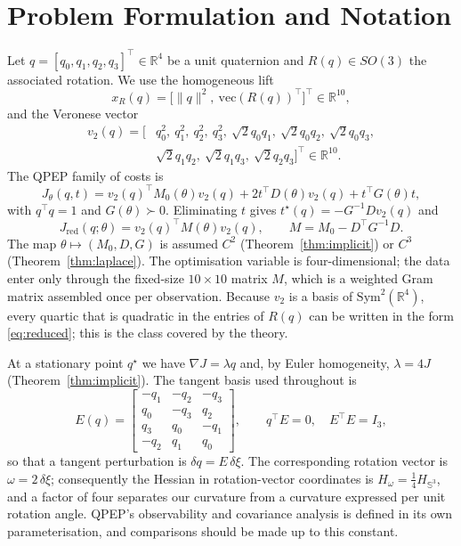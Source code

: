 \section{Problem Formulation and Notation}\label{sec:formulation}

Let $q=[q_0,q_1,q_2,q_3]^\top\in\mathbb{R}^4$ be a unit quaternion and $R(q)\in SO(3)$ the associated rotation. We use the homogeneous lift
\begin{equation}
x_R(q)=\big[\|q\|^2,\ \mathrm{vec}(R(q))^\top\big]^\top\in\mathbb{R}^{10},
\label{eq:lift}
\end{equation}
and the Veronese vector
\begin{equation}
\begin{split}
v_2(q)=\big[&q_0^2,\ q_1^2,\ q_2^2,\ q_3^2,\ \sqrt2q_0q_1,\ \sqrt2q_0q_2,\ \sqrt2q_0q_3,\\
&\sqrt2q_1q_2,\ \sqrt2q_1q_3,\ \sqrt2q_2q_3\big]^\top\in\mathbb{R}^{10}.
\end{split}
\label{eq:veronese}
\end{equation}
The QPEP family of costs \cite{wu2022qpep} is
\begin{equation}
J_\theta(q,t)=v_2(q)^\top M_0(\theta)v_2(q)+2t^\top D(\theta)v_2(q)+t^\top G(\theta)t,
\label{eq:cost}
\end{equation}
with $q^\top q=1$ and $G(\theta)\succ0$. Eliminating $t$ gives $t^\star(q)=-G^{-1}Dv_2(q)$ and
\begin{equation}
J_{\mathrm{red}}(q;\theta)=v_2(q)^\top M(\theta)v_2(q),\qquad M=M_0-D^\top G^{-1}D .
\label{eq:reduced}
\end{equation}
The map $\theta\mapsto(M_0,D,G)$ is assumed $C^2$ (Theorem~\ref{thm:implicit}) or $C^3$ (Theorem~\ref{thm:laplace}). The optimisation variable is four-dimensional; the data enter only through the fixed-size $10\times10$ matrix $M$, which is a weighted Gram matrix assembled once per observation. Because $v_2$ is a basis of $\mathrm{Sym}^2(\mathbb{R}^4)$, every quartic that is quadratic in the entries of $R(q)$ can be written in the form \eqref{eq:reduced}; this is the class covered by the theory.

At a stationary point $q^\star$ we have $\nabla J=\lambda q$ and, by Euler homogeneity, $\lambda=4J$ (Theorem~\ref{thm:implicit}). The tangent basis used throughout is
\begin{equation}
E(q)=\begin{bmatrix}-q_1&-q_2&-q_3\\ q_0&-q_3&q_2\\ q_3&q_0&-q_1\\ -q_2&q_1&q_0\end{bmatrix},\qquad q^\top E=0,\quad E^\top E=I_3,
\label{eq:tangent}
\end{equation}
so that a tangent perturbation is $\delta q=E\,\delta\xi$. The corresponding rotation vector is $\omega=2\,\delta\xi$; consequently the Hessian in rotation-vector coordinates is $H_\omega=\tfrac14H_{\mathbb{S}^3}$, and a factor of four separates our curvature from a curvature expressed per unit rotation angle. QPEP's observability and covariance analysis is defined in its own parameterisation, and comparisons should be made up to this constant.

